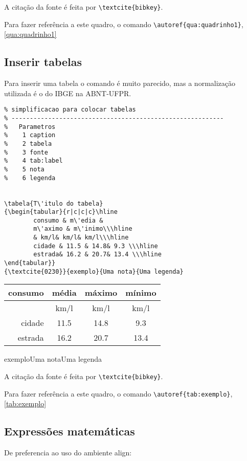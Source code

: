 A citação da fonte é feita por \verb+\textcite{bibkey}+.

Para fazer referência a este quadro, o comando \verb+\autoref{qua:quadrinho1}+,\autoref{qua:quadrinho1}


\subsection[Tabelas]{Inserir tabelas}

Para inserir uma tabela o comando é muito parecido, mas a normalização utilizada é o do IBGE na ABNT-UFPR.

\begin{lstlisting}
% simplificacao para colocar tabelas
% ----------------------------------------------------------
%   Parametros
%    1 caption
%    2 tabela
%    3 fonte
%    4 tab:label
%    5 nota
%    6 legenda


\tabela{T\'itulo do tabela}
{\begin{tabular}{r|c|c|c}\hline
		consumo & m\'edia & 
		m\'aximo & m\'inimo\\\hline
		& km/l& km/l& km/l\\\hline
		cidade & 11.5 & 14.8& 9.3 \\\hline
		estrada& 16.2 & 20.7& 13.4 \\\hline
\end{tabular}}
{\textcite{0230}}{exemplo}{Uma nota}{Uma legenda}
\end{lstlisting}


{\begin{tabular}{r|c|c|c}\hline
		consumo & m\'edia & 
		m\'aximo & m\'inimo\\\hline
		& km/l& km/l& km/l\\\hline
		cidade & 11.5 & 14.8& 9.3 \\\hline
		estrada& 16.2 & 20.7& 13.4 \\\hline
\end{tabular}}
{\textcite{ibge1993}}{exemplo}{Uma nota}{Uma legenda}


A citação da fonte é feita por \verb+\textcite{bibkey}+.

Para fazer referência a este quadro, o comando \verb+\autoref{tab:exemplo}+, \autoref{tab:exemplo}
\subsection[Equações]{Expressões matemáticas}

De preferencia ao uso do ambiente align:

